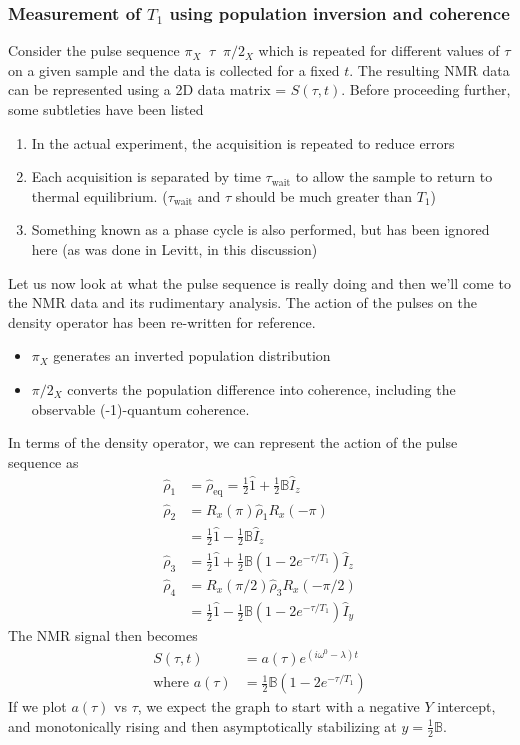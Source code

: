 		\subsubsection{Measurement of $T_1$ using population inversion and coherence}
			Consider the pulse sequence $\pi_X \;\; \tau \;\; \pi/2_X$ which is repeated for different values of $\tau$ on a given sample and the data is collected for a fixed $t$. The resulting NMR data can be represented using a 2D data matrix = $S(\tau,t)$.
			Before proceeding further, some subtleties have been listed
			\begin{enumerate}
				\item In the actual experiment, the acquisition is repeated to reduce errors
				\item Each acquisition is separated by time $\tau_\text{wait}$ to allow the sample to return to thermal equilibrium. ($\tau_\text{wait}$ and $\tau$ should be much greater than $T_1$)
				\item Something known as a phase cycle is also performed, but has been ignored here (as was done in Levitt, in this discussion)
			\end{enumerate}
			Let us now look at what the pulse sequence is really doing and then we'll come to the NMR data and its rudimentary analysis. The action of the pulses on the density operator has been re-written for reference.
			\begin{itemize}
				\item $\pi_X$ generates an inverted population distribution
				\item $\pi/2_X$ converts the population difference into coherence, including the observable (-1)-quantum coherence.
			\end{itemize}
			In terms of the density operator, we can represent the action of the pulse sequence as
			\begin{align}
				\hat \rho_1  &= \hat \rho_\text{eq} = \frac 1 2  \hat 1 + \frac 1 2 \mathbb B \hat I_z \\
				\hat \rho_2  &= R_x(\pi) \hat \rho_1 R_x(-\pi) \\
						&= \frac 1 2 \hat 1 - \frac 1 2 \mathbb B \hat I_z \\
				\hat \rho_3  &= \frac 1 2 \hat 1 + \frac 1 2 \mathbb B (1-2 e^{-\tau/T_1})\hat I_z \\
				\hat \rho_4	&= R_x(\pi/2) \hat \rho_3 R_x(-\pi/2) \\
						&= \frac 1 2 \hat 1 - \frac 1 2 \mathbb B (1 - 2 e^{-\tau/T_1}) \hat I_y
			\end{align}
			The NMR signal then becomes
			\begin{align}
				S(\tau,t) &=a(\tau)e^{(i\omega^0 - \lambda)t} \\
				\text{where   } a(\tau)&=\frac 1 2 \mathbb B(1-2e^{-\tau/T_1})
			\end{align}
			If we plot $a(\tau)$ vs $\tau$, we expect the graph to start with a negative $Y$ intercept, and monotonically rising and then asymptotically stabilizing at $y=\frac 1 2 \mathbb B$.
